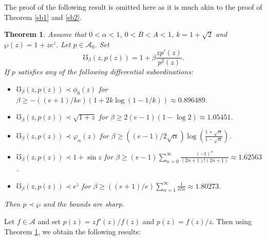 \documentclass[12pt, reqno]{amsart}
\numberwithin{equation}{section}
\theoremstyle{plain}
\newtheorem{theorem}{Theorem}[section]
\theoremstyle{definition}
\theoremstyle{remark}
\begin{document}
The proof of the following result is omitted here as it is much akin to the proof of Theorem \ref{sb1} and \ref{sb2}. 
\begin{theorem}\label{sb3}
	Assume that $0<\alpha<1$, $0<B<A<1$, $k=1+\sqrt{2}$ and $\wp(z)=1+ze^z$. Let $p\in \mathcal{A}_{0}$. Set
	\begin{equation*}
	\mho_\beta(z, p(z))=1+\beta\frac{zp'(z)}{p^2(z)}.
	\end{equation*}  
	If $p$ satisfies any of the following differential subordinations: 	
	\begin{itemize}
		\item [$(i)$] $\mho_\beta(z, p(z)) \prec \phi_0(z)$ for $\beta\geq-((e+1)/ke)(1+2k\log(1-1/k))\approx0.896489$.
		\item [$(ii)$] $\mho_\beta(z, p(z)) \prec \sqrt{1+z}$ for $\beta \geq2(e-1)(1-\log{2})\approx1.05451 $.
		\item [$(iii)$] $\mho_\beta(z, p(z)) \prec \varphi_\alpha(z)$ for $\beta\geq ((e-1)/2\sqrt{\alpha})\log(\frac{1+\sqrt{\alpha}}{1-\sqrt{\alpha}})$.
		\item [$(iv)$] $\mho_\beta(z, p(z)) \prec 1+\sin{z}$ for $\beta \geq(e-1)\sum_{n=0}^{\infty}\frac{(-1)^n}{(2n+1)!(2n+1)}\approx1.62563$.
		\item [$(v)$] $\mho_\beta(z, p(z)) \prec e^z$ for $\beta\geq((e+1)/e)\sum_{n=1}^{\infty}\frac{1}{n!n}\approx1.80273$.
	\end{itemize}
	Then $p \prec \wp$ and the bounds are sharp.
\end{theorem}

Let $f\in\mathcal{A}$ and set $p(z)=zf'(z)/f(z)$ and $p(z)=f(z)/z$. Then using Theorem \ref{sb3}, we obtain the following results:
\end{document}
